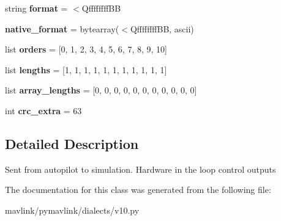 \begin{DoxyCompactItemize}
\item 
\mbox{\label{classpymavlink_1_1dialects_1_1v10_1_1MAVLink__hil__controls__message_a174b681460d5263a7ccca4f4ea1255ee}} 
string {\bfseries format} = \textquotesingle{}$<$Qffffffff\+BB\textquotesingle{}
\item 
\mbox{\label{classpymavlink_1_1dialects_1_1v10_1_1MAVLink__hil__controls__message_a1eb31c552825db1c984b561d297a47a4}} 
{\bfseries native\+\_\+format} = bytearray(\textquotesingle{}$<$Qffffffff\+BB\textquotesingle{}, \textquotesingle{}ascii\textquotesingle{})
\item 
\mbox{\label{classpymavlink_1_1dialects_1_1v10_1_1MAVLink__hil__controls__message_a9f1962c4a1b9b6fdd008a6788cb86e41}} 
list {\bfseries orders} = \mbox{[}0, 1, 2, 3, 4, 5, 6, 7, 8, 9, 10\mbox{]}
\item 
\mbox{\label{classpymavlink_1_1dialects_1_1v10_1_1MAVLink__hil__controls__message_a88a6fb308e760af8663002bdb83a5085}} 
list {\bfseries lengths} = \mbox{[}1, 1, 1, 1, 1, 1, 1, 1, 1, 1, 1\mbox{]}
\item 
\mbox{\label{classpymavlink_1_1dialects_1_1v10_1_1MAVLink__hil__controls__message_ae2eb57c52b9933a988c31e0d7da060b0}} 
list {\bfseries array\+\_\+lengths} = \mbox{[}0, 0, 0, 0, 0, 0, 0, 0, 0, 0, 0\mbox{]}
\item 
\mbox{\label{classpymavlink_1_1dialects_1_1v10_1_1MAVLink__hil__controls__message_a10ed599f1999893e28c440b205031217}} 
int {\bfseries crc\+\_\+extra} = 63
\end{DoxyCompactItemize}


\subsection{Detailed Description}
\begin{DoxyVerb}Sent from autopilot to simulation. Hardware in the loop
control outputs
\end{DoxyVerb}
 

The documentation for this class was generated from the following file\+:\begin{DoxyCompactItemize}
\item 
mavlink/pymavlink/dialects/v10.\+py\end{DoxyCompactItemize}
